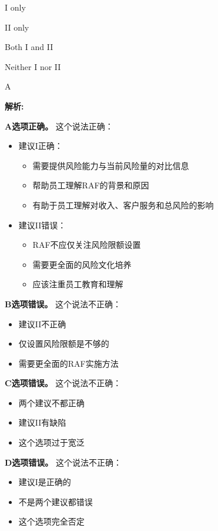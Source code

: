 \documentclass{article}
\newenvironment{explanation}
{\textbf{解析:}\par}
{\par}
\begin{document}
\begin{choices}
    \item I only
    \item II only
    \item Both I and II
    \item Neither I nor II
\end{choices}

\begin{correctanswer}
    A
\end{correctanswer}

\begin{explanation}
    \textbf{A选项正确。}
    这个说法正确：
    \begin{itemize}
        \item 建议I正确：
        \begin{itemize}
            \item 需要提供风险能力与当前风险量的对比信息
            \item 帮助员工理解RAF的背景和原因
            \item 有助于员工理解对收入、客户服务和总风险的影响
        \end{itemize}
        \item 建议II错误：
        \begin{itemize}
            \item RAF不应仅关注风险限额设置
            \item 需要更全面的风险文化培养
            \item 应该注重员工教育和理解
        \end{itemize}
    \end{itemize}

    \textbf{B选项错误。}
    这个说法不正确：
    \begin{itemize}
        \item 建议II不正确
        \item 仅设置风险限额是不够的
        \item 需要更全面的RAF实施方法
    \end{itemize}

    \textbf{C选项错误。}
    这个说法不正确：
    \begin{itemize}
        \item 两个建议不都正确
        \item 建议II有缺陷
        \item 这个选项过于宽泛
    \end{itemize}

    \textbf{D选项错误。}
    这个说法不正确：
    \begin{itemize}
        \item 建议I是正确的
        \item 不是两个建议都错误
        \item 这个选项完全否定
    \end{itemize}
\end{explanation}
\end{document}
